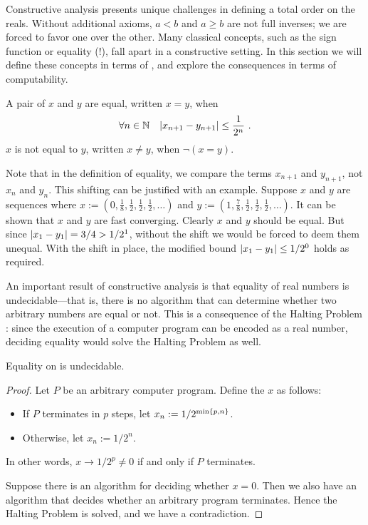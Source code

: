 \documentclass[leqno]{report}
\begin{document}
Constructive analysis presents unique challenges in defining a total order on the reals. Without additional axioms, $a < b$ and $a \geq b$ are not full inverses; we are forced to favor one over the other. Many classical concepts, such as the sign function or equality (!), fall apart in a constructive setting. In this section we will define these concepts in terms of \FCCS{}, and explore the consequences in terms of computability.

\begin{Definition}[Equality]
    A pair of \FCCS{} $x$ and $y$ are equal, written $x = y$, when
    \[
        \forall {n \in \mathbb{N}} \quad {\left| x_{n+1} - y_{n+1} \right| \leq \frac{1}{2^n}} \ .
    \]
    $x$ is not equal to $y$, written $x \neq y$, when $\neg (x = y)$.
\end{Definition}

Note that in the definition of equality, we compare the terms $x_{n+1}$ and $y_{n+1}$, not $x_n$ and $y_n$. This shifting can be justified with an example. Suppose $x$ and $y$ are sequences where $x := (0, \frac{1}{8}, \frac{1}{2}, \frac{1}{2}, \frac{1}{2}, \ldots)$ and $y := (1, \frac{7}{8}, \frac{1}{2}, \frac{1}{2}, \frac{1}{2}, \ldots)$. It can be shown that $x$ and $y$ are fast converging. Clearly $x$ and $y$ should be equal. But since $\left| x_1 - y_1 \right| = 3/4 > 1/2^1$, without the shift we would be forced to deem them unequal. With the shift in place, the modified bound $\left| x_1 - y_1 \right| \leq 1/2^0$ holds as required.

An important result of constructive analysis is that equality of real numbers is undecidable---that is, there is no algorithm that can determine whether two arbitrary numbers are equal or not. This is a consequence of the Halting Problem \citep{turing1936computable}: since the execution of a computer program can be encoded as a real number, deciding equality would solve the Halting Problem as well.

\begin{Proposition} \label{equality_undecidable}
    Equality on \FCCS{} is undecidable.
\end{Proposition}

\begin{proof}
    Let $P$ be an arbitrary computer program. Define the \FCCS{} $x$ as follows:
    \begin{itemize}
        \item If $P$ terminates in $p$ steps, let $x_n := 1/2^{\min\left\{ p, n \right\}}$.
        \item Otherwise, let $x_n := 1/2^n$.
    \end{itemize}
    In other words, $x \rightarrow 1/2^p \neq 0$ if and only if $P$ terminates.

    Suppose there is an algorithm for deciding whether $x = 0$. Then we also have an algorithm that decides whether an arbitrary program terminates. Hence the Halting Problem is solved, and we have a contradiction.
\end{proof}
\end{document}
